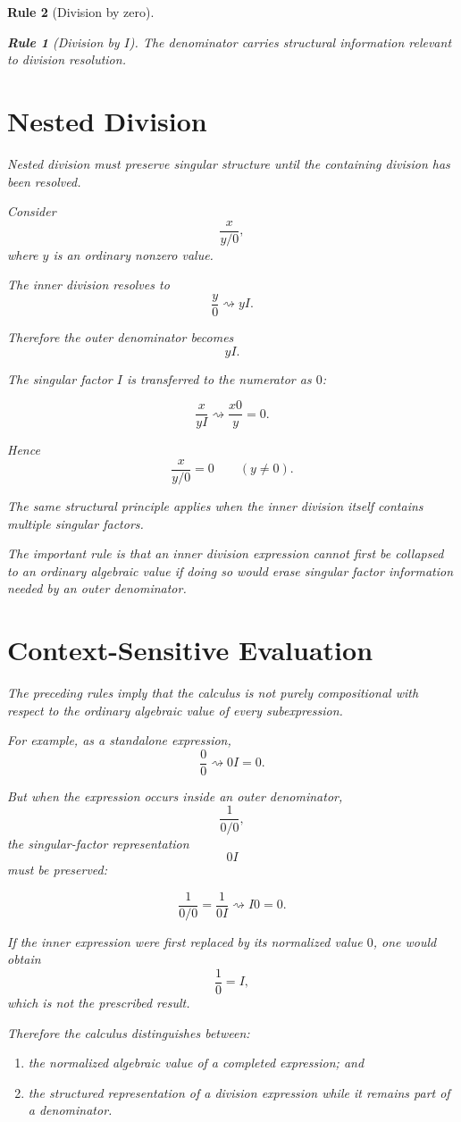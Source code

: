 \documentclass[11pt,a4paper]{article}
\newtheorem{rulethm}{Rule}[section]
\begin{document}
\begin{rulethm}[Division by zero]
\begin{rulethm}[Division by $I$]
The denominator carries structural information relevant to division
resolution.

\section{Nested Division}

Nested division must preserve singular structure until the containing
division has been resolved.

Consider
\[
\frac{x}{y/0},
\]
where $y$ is an ordinary nonzero value.

The inner division resolves to
\[
\frac{y}{0}\rightsquigarrow yI.
\]

Therefore the outer denominator becomes
\[
yI.
\]

The singular factor $I$ is transferred to the numerator as $0$:

\[
\frac{x}{yI}
\rightsquigarrow
\frac{x0}{y}
=
0.
\]

Hence
\[
\boxed{\frac{x}{y/0}=0}
\qquad(y\neq0).
\]

The same structural principle applies when the inner division itself
contains multiple singular factors.

The important rule is that an inner division expression cannot first be
collapsed to an ordinary algebraic value if doing so would erase singular
factor information needed by an outer denominator.

\section{Context-Sensitive Evaluation}

The preceding rules imply that the calculus is not purely compositional with
respect to the ordinary algebraic value of every subexpression.

For example, as a standalone expression,
\[
\frac00\rightsquigarrow0I=0.
\]

But when the expression occurs inside an outer denominator,
\[
\frac{1}{0/0},
\]
the singular-factor representation
\[
0I
\]
must be preserved:

\[
\frac{1}{0/0}
=
\frac{1}{0I}
\rightsquigarrow I0
=0.
\]

If the inner expression were first replaced by its normalized value $0$,
one would obtain
\[
\frac10=I,
\]
which is not the prescribed result.

Therefore the calculus distinguishes between:

\begin{enumerate}
    \item the normalized algebraic value of a completed expression; and
    \item the structured representation of a division expression while it
    remains part of a denominator.
\end{enumerate}


\end{rulethm}
\end{rulethm}
\end{document}
